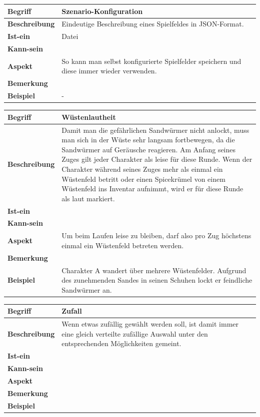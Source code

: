 \documentclass[12pt]{article}
\newcounter{fa}
\newcounter{nfa}
\begin{document}
\begin{tabularx}{\linewidth}{|l|X|}
\hline
\textbf{Begriff} & \textbf{Szenario-Konfiguration } \\
\hline
\textbf{Beschreibung} & Eindeutige Beschreibung eines Spielfeldes in JSON-Format. \\
\hline
\textbf{Ist-ein} & Datei \\
\hline
\textbf{Kann-sein} & \\
\hline
\textbf{Aspekt} & So kann man selbst konfigurierte Spielfelder speichern und diese immer wieder verwenden.\\
\hline
\textbf{Bemerkung} &  \\
\hline
\textbf{Beispiel} & - \\
\hline
\end{tabularx}

\begin{tabularx}{\linewidth}{|l|X|}
\hline
\textbf{Begriff} & \textbf{Wüstenlautheit} \\
\hline
\textbf{Beschreibung} & Damit man die gefährlichen Sandwürmer nicht anlockt, muss man sich in der Wüste sehr langsam fortbewegen, da die Sandwürmer auf Geräusche reagieren. Am Anfang seines Zuges gilt jeder Charakter als \glqq{}leise\grqq{} für diese Runde. Wenn der Charakter während seines Zuges mehr als einmal ein Wüstenfeld betritt oder einen Spicekrümel von einem Wüstenfeld ins Inventar aufnimmt, wird er für diese Runde als \glqq{}laut\grqq{} markiert.\\
\hline
\textbf{Ist-ein} & \\
\hline
\textbf{Kann-sein} & \\
\hline
\textbf{Aspekt} & Um beim Laufen leise zu bleiben, darf also pro Zug höchstens einmal ein Wüstenfeld betreten werden.\\
\hline
\textbf{Bemerkung} &  \\
\hline
\textbf{Beispiel} & Charakter A wandert über mehrere Wüstenfelder. Aufgrund des zunehmenden Sandes in seinen Schuhen lockt er feindliche Sandwürmer an. \\
\hline
\end{tabularx}

\begin{tabularx}{\linewidth}{|l|X|}
\hline
\textbf{Begriff} & \textbf{Zufall  } \\
\hline
\textbf{Beschreibung} & Wenn etwas zufällig gewählt werden soll, ist damit immer eine gleich verteilte zufällige Auswahl unter den
entsprechenden Möglichkeiten gemeint. \\
\hline
\textbf{Ist-ein} & \\
\hline
\textbf{Kann-sein} & \\
\hline
\textbf{Aspekt} &  \\
\hline
\textbf{Bemerkung} & \\
\hline
\textbf{Beispiel} & \\
\hline
\end{tabularx}
\end{document}
